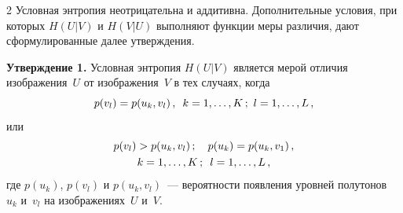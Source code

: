 \begin{multicols}{2}
  Условная энтропия неотрицательна и аддитивна. Дополнительные условия, при которых 
$H(U\vert V)$ и $H(V\vert U)$ выполняют функции меры различия, дают сформулированные 
далее утверждения. 

\medskip

\noindent
\textbf{Утверждение 1.} Условная энтропия $H(U\vert V)$ является мерой отличия 
изображения~$U$ от изображения~$V$ в тех случаях, когда
\begin{equation}
p(v_l)=p(u_k,v_l)\,,\enskip k=1, \ldots , K\,;\ l=1, \ldots ,L\,,
\label{e4mur}
\end{equation}
или
\begin{multline}
p(v_l)>p(u_k,v_l)\,;\quad p(u_k)=p(u_k,v_1)\,,\\
k=1, \ldots , K\,;\enskip l=1, \ldots ,L\,,
\label{e5mur}
\end{multline}
где $p(u_k)$, $p(v_l)$ и $p(u_k,v_l)$~--- вероятности появления уровней полутонов~$u_k$ 
и~$v_l$ на изображениях~$U$ и~$V$.

      \begin{figure} %
       \vspace*{1pt}
       \begin{minipage}[t]{80mm}
 \begin{center}
 \mbox{%
 \epsfxsize=78.099mm
 }
 \end{center}
 \vspace*{-9pt}
\end{minipage}
\hfill
       \vspace*{1pt}
       \begin{minipage}[t]{80mm}
 \begin{center}
 \mbox{%
 \epsfxsize=78.455mm
 }
 \end{center}
 \vspace*{-9pt}
\end{minipage}
\vspace*{6pt}
\end{figure}

\begin{figure}[b] %
       \vspace*{6pt}
 \begin{center}
 \mbox{%
 \epsfxsize=150.06mm
 }
 \end{center}
 \vspace*{-9pt}
\end{figure}


\end{multicols}
